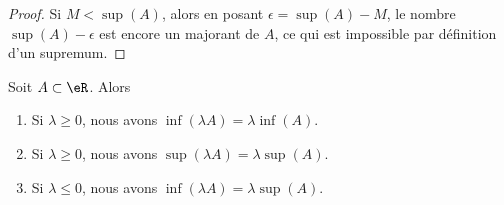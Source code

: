\begin{proof}
	Si \( M<\sup(A)\), alors en posant \( \epsilon=\sup(A)-M\), le nombre \( \sup(A)-\epsilon\) est encore un majorant de \( A\), ce qui est impossible par définition d'un supremum.
\end{proof}

\begin{proposition}	\label{PROPooGOPOooYyZSuU}
	Soit \( A\subset \eR\). Alors
	\begin{enumerate}
		\item		\label{ITEMooAQNRooXFnsrA}
		      Si \( \lambda\geq 0\), nous avons \(  \inf(\lambda A)=\lambda\inf(A)\).
		\item		\label{ITEMooPCDXooRJraYV}
		      Si \( \lambda \geq 0\), nous avons \( \sup(\lambda A)=\lambda\sup(A)\).
		\item		\label{ITEMooHPBEooGaKRDf}
		      Si \( \lambda\leq 0\), nous avons \( \inf(\lambda A)=\lambda\sup(A)\).
	\end{enumerate}
	\begin{equation}
	\end{equation}
\end{proposition}

